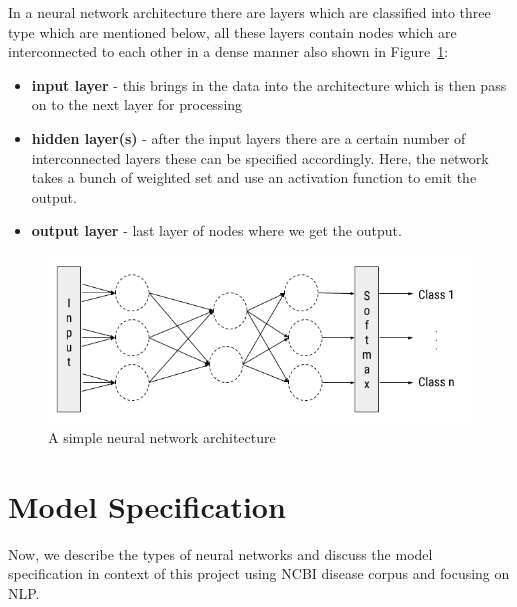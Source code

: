 In a neural network architecture there are layers which are classified into three type which are mentioned below, all these layers contain nodes which are interconnected to each other in a dense manner also shown in Figure~\ref{fig:nn}:
\begin{itemize}
    \item \textbf{input layer} - this brings in the data into the architecture which is then pass on to the next layer for processing
    \item \textbf{hidden layer(s)} - after the input layers there are a certain number of interconnected layers these can be specified accordingly. Here, the network takes a bunch of weighted set and use an activation function to emit the output.
    \item \textbf{output layer} - last layer of nodes where we get the output.
\end{itemize}
\begin{figure}[!htb]
    \centering
    \includegraphics[scale=0.6]{Figures/neural-network.png}
    \caption{A simple neural network architecture}
    \label{fig:nn}
\end{figure}




\section{Model Specification}
Now, we describe the types of neural networks and discuss the model specification in context of this project using NCBI disease corpus and focusing on NLP. 
